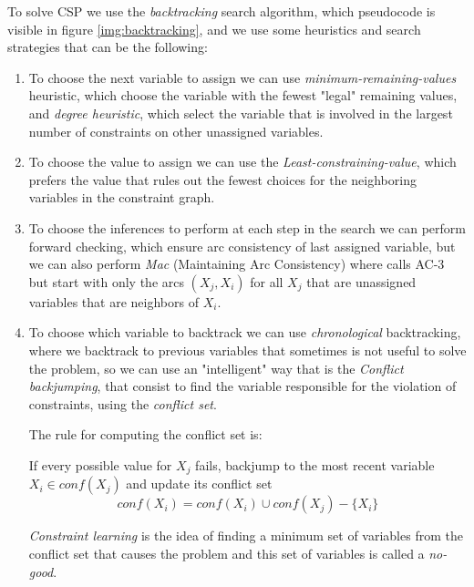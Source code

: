 To solve CSP we use the \emph{backtracking} search algorithm, which pseudocode
is visible in figure \ref{img:backtracking}, and we use some heuristics and 
search strategies that can be the following:
\begin{enumerate}
	\item To choose the next variable to assign we can use \emph{minimum-remaining-values} heuristic, which choose the variable with the fewest "legal" remaining values,
	     and \emph{degree heuristic}, which select the variable that is involved
	     in the largest number of constraints on other unassigned variables.

	\item To choose the value to assign we can use the \emph{Least-constraining-value}, which prefers the value that rules out the fewest choices for the neighboring 
	     variables in the constraint graph.

	\item To choose the inferences to perform at each step in the search we can
	      perform forward checking, which ensure arc consistency of last assigned 
	      variable, but we can also perform \emph{Mac} (Maintaining Arc Consistency)
	      where calls AC-3 but start with only the arcs $(X_j, X_i)$ for all
	      $X_j$ that are unassigned variables that are neighbors of $X_i$.
        \item To choose which variable to backtrack we can use \emph{chronological} 
	      backtracking, where we backtrack to previous variables that sometimes
	      is not useful to solve the problem, so we can use an "intelligent" 
	      way that is the \emph{Conflict backjumping}, that consist to find the 
	      variable responsible for the violation of constraints, using the 
	      \emph{conflict set}.

	      The rule for computing the conflict set is:
	      \begin{defi}
		  If every possible value for $X_j$ fails, backjump to the most recent
		  variable $X_i \in conf(X_j)$ and update its conflict set
		  \[ conf(X_i) = conf(X_i) \cup conf(X_j) - \{X_i\} \]
	      \end{defi}
	      \emph{Constraint learning} is the idea of finding a minimum set of 
	      variables from the conflict set that causes the problem and this set
	      of variables is called a \emph{no-good}.
\end{enumerate}

